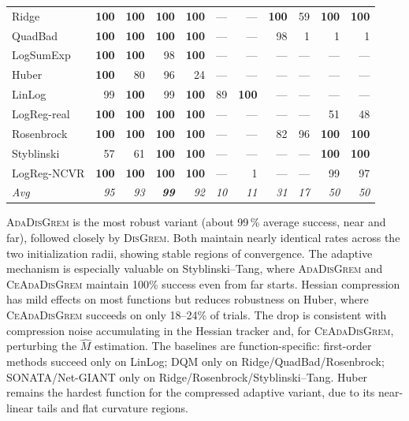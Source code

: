 \documentclass[review,onefignum,onetabnum]{siamart171218}
\begin{document}
\begin{table}[htbp]
\begin{tabular}{l rrrr rr rrrr}
			\midrule
			Ridge       & \textbf{100} & \textbf{100} & \textbf{100} & \textbf{100} & --- & --- & \textbf{100} & 59 & \textbf{100} & \textbf{100} \\
			QuadBad     & \textbf{100} & \textbf{100} & \textbf{100} & \textbf{100} & --- & --- & 98 & 1 & 1 & 1 \\
			LogSumExp   & \textbf{100} & \textbf{100} & 98 & \textbf{100} & --- & --- & --- & --- & --- & --- \\
			Huber       & \textbf{100} & 80 & 96 & 24 & --- & --- & --- & --- & --- & --- \\
			LinLog      & 99 & \textbf{100} & 99 & \textbf{100} & 89 & \textbf{100} & --- & --- & --- & --- \\
			LogReg-real & \textbf{100} & \textbf{100} & \textbf{100} & \textbf{100} & --- & --- & --- & --- & 51 & 48 \\
			Rosenbrock  & \textbf{100} & \textbf{100} & \textbf{100} & \textbf{100} & --- & --- & 82 & 96 & \textbf{100} & \textbf{100} \\
			Styblinski  & 57 & 61 & \textbf{100} & \textbf{100} & --- & --- & --- & --- & \textbf{100} & \textbf{100} \\
			LogReg-NCVR & \textbf{100} & \textbf{100} & \textbf{100} & \textbf{100} & --- & 1 & --- & --- & 99 & 97 \\
			\textit{Avg} & \textit{95} & \textit{93} & \textbf{\textit{99}} & \textit{92}
			& \textit{10} & \textit{11} & \textit{31} & \textit{17}
			& \textit{50} & \textit{50} \\
			\bottomrule
		\end{tabular}
	\end{table}
	
	\textsc{AdaDisGrem} is the most robust variant
	(about 99\,\% average success, near and far), followed closely by
	\textsc{DisGrem}.
	Both maintain nearly identical rates across the two initialization
	radii, showing stable regions of convergence.
	The adaptive mechanism is especially valuable on
	Styblinski--Tang, where \textsc{AdaDisGrem} and
	\textsc{CeAdaDisGrem} maintain 100\% success even from far starts.
	Hessian compression has mild effects on most functions but reduces robustness on Huber,
	where \textsc{CeAdaDisGrem} succeeds on only 18--24\% of trials.
	The drop is consistent with compression noise accumulating in the
	Hessian tracker and, for \textsc{CeAdaDisGrem}, perturbing the
	$\hat M$ estimation.
	The baselines are function-specific:
	first-order methods succeed only on LinLog; DQM only on
	Ridge/QuadBad/Rosenbrock; SONATA/Net-GIANT only on
	Ridge/Rosenbrock/Styblinski--Tang.
	Huber remains the hardest function for the compressed adaptive variant,
	due to its near-linear tails and flat curvature regions.
	
\end{document}

